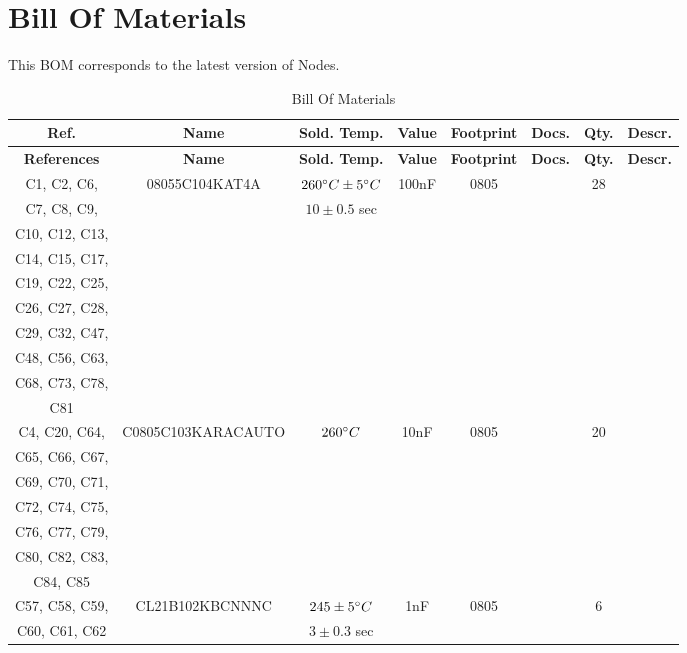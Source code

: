 \documentclass[10pt]{datasheet}
\begin{document}
\section{Bill Of Materials}
This BOM corresponds to the latest version of Nodes.
\begin{longtable}{| c | c | c | c | c | c | c | c |}
    \caption{Bill Of Materials}
    \label{table:bom} \\
    \thickhline
    \textbf{Ref.} & \textbf{Name} & \textbf{Sold. Temp.} & \textbf{Value} & \textbf{Footprint} & \textbf{Docs.} & \textbf{Qty.} & \textbf{Descr.} \\
    \hline
    \endfirsthead
    \hline
    \textbf{References} & \textbf{Name} & \textbf{Sold. Temp.} & \textbf{Value} & \textbf{Footprint} & \textbf{Docs.} & \textbf{Qty.} & \textbf{Descr.} \\
    \hline
    \endhead
    \hline
    \endfoot
    \hline
    \endlastfoot
    C1, C2, C6, & 08055C104KAT4A & $260\degree C\pm 5\degree C$ & 100nF & 0805 & \cite{ref20} & 28 & \\
    C7, C8, C9, & & $10\pm 0.5$ sec & & & & &\\
    C10, C12, C13, & & & & & & &\\
    C14, C15, C17, & & & & & & &\\
    C19, C22, C25, & & & & & & &\\
    C26, C27, C28, & & & & & & &\\
    C29, C32, C47, & & & & & & &\\
    C48, C56, C63, & & & & & & &\\
    C68, C73, C78, & & & & & & &\\
    C81 & & & & & & &\\
    \hline
    C4, C20, C64, & C0805C103KARACAUTO & $260\degree C$ & 10nF & 0805 & \cite{ref21} & 20 &\\
    C65, C66, C67, & & & & & & &\\
    C69, C70, C71, & & & & & & &\\
    C72, C74, C75, & & & & & & &\\
    C76, C77, C79, & & & & & & &\\
    C80, C82, C83, & & & & & & &\\
    C84, C85 & & & & & & &\\
    \hline
    C57, C58, C59, & CL21B102KBCNNNC & $245\pm 5\degree C$ & 1nF & 0805 & \cite{ref22} & 6 &\\
    C60, C61, C62 & & $3\pm 0.3$ sec & & & & &\\
    \hline

\end{longtable}
\end{document}
